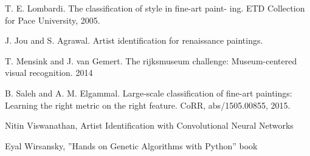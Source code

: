 \begin{thebibliography}{1}


T. E. Lombardi. The classification of style in fine-art paint- ing. ETD Collection for Pace University, 2005.

J. Jou and S. Agrawal. Artist identification for renaissance paintings.

T. Mensink and J. van Gemert. The rijksmuseum challenge: Museum-centered visual recognition. 2014

B. Saleh and A. M. Elgammal. Large-scale classification of fine-art paintings: Learning the right metric on the right feature. CoRR, abs/1505.00855, 2015.

Nitin Viswanathan, Artist Identification with Convolutional Neural Networks

Eyal Wirsansky, ”Hands on Genetic Algorithms with Python” book

\end{thebibliography}